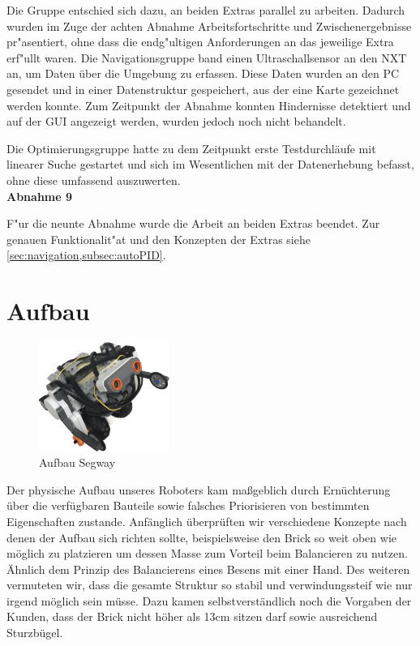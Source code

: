 \documentclass[oneside,abstractoff,a4paper]{scrartcl}
\begin{document}
Die Gruppe entschied sich dazu, an beiden Extras parallel zu arbeiten. Dadurch wurden im Zuge der achten Abnahme Arbeitsfortschritte und Zwischenergebnisse pr"asentiert, ohne dass die endg"ultigen Anforderungen an das jeweilige Extra erf"ullt waren. Die Navigationsgruppe band einen Ultraschallsensor an den NXT an, um Daten über die Umgebung zu erfassen. Diese Daten wurden an den PC gesendet und in einer Datenstruktur gespeichert, aus der eine Karte gezeichnet werden konnte. Zum Zeitpunkt der Abnahme konnten Hindernisse detektiert und auf der GUI angezeigt werden, wurden jedoch noch nicht behandelt.

Die Optimierungsgruppe hatte zu dem Zeitpunkt erste Testdurchläufe mit linearer Suche gestartet und sich im Wesentlichen mit der Datenerhebung befasst, ohne diese umfassend auszuwerten. \\

\noindent\textbf{Abnahme 9}

F"ur die neunte Abnahme wurde die Arbeit an beiden Extras beendet. Zur genauen Funktionalit"at und den Konzepten der Extras siehe \cref{sec:navigation,subsec:autoPID}.

\newpage
\section{Aufbau}
\begin{figure}
  \begin{center}
    \includegraphics[width=0.38\textwidth]{NXT_3.jpg}
  \end{center}
  \caption{Aufbau Segway}
\end{figure}
Der physische Aufbau unseres Roboters kam maßgeblich durch Ernüchterung über die verfügbaren Bauteile sowie falsches Priorisieren von bestimmten Eigenschaften zustande. 
Anfänglich überprüften wir verschiedene Konzepte nach denen der Aufbau sich richten sollte, beispielsweise den Brick so weit oben wie möglich zu platzieren um dessen Masse zum Vorteil beim Balancieren zu nutzen. Ähnlich dem Prinzip des Balancierens eines Besens mit einer Hand. Des weiteren vermuteten wir, dass die gesamte Struktur so stabil und verwindungssteif wie nur irgend möglich sein müsse. Dazu kamen selbstverständlich noch die Vorgaben der Kunden, dass der Brick nicht höher als 13cm sitzen darf sowie ausreichend Sturzbügel.
\end{document}
